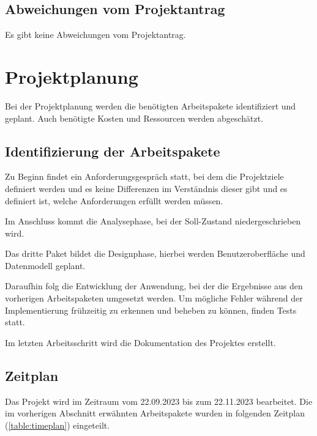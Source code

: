 \documentclass[12pt]{article}
\begin{document}
\subsection{Abweichungen vom Projektantrag}
Es gibt keine Abweichungen vom Projektantrag.


%
%

\section{Projektplanung}
Bei der Projektplanung werden die benötigten Arbeitspakete identifiziert und geplant.
Auch benötigte Kosten und Ressourcen werden abgeschätzt.

\subsection{Identifizierung der Arbeitspakete}
Zu Beginn findet ein Anforderungsgespräch statt, bei dem die Projektziele 
definiert werden und es keine Differenzen im Verständnis dieser gibt und es 
definiert ist, welche Anforderungen erfüllt werden müssen. 

Im Anschluss kommt die Analysephase, bei der Soll-Zustand niedergeschrieben wird.  

Das dritte Paket bildet die Designphase, hierbei werden Benutzeroberfläche und 
Datenmodell geplant.  

Daraufhin folg die Entwicklung der Anwendung, bei der die Ergebnisse aus den 
vorherigen Arbeitspaketen umgesetzt werden. Um mögliche Fehler während der 
Implementierung frühzeitig zu erkennen und beheben zu können, finden Tests statt. 

Im letzten Arbeitsschritt wird die Dokumentation des Projektes erstellt. 

\subsection{Zeitplan}
Das Projekt wird im Zeitraum vom 22.09.2023 bis zum 22.11.2023 bearbeitet. 
Die im vorherigen Abschnitt erwähnten Arbeitspakete wurden in folgenden Zeitplan 
(\autoref{table:timeplan}) eingeteilt. 
\end{document}

